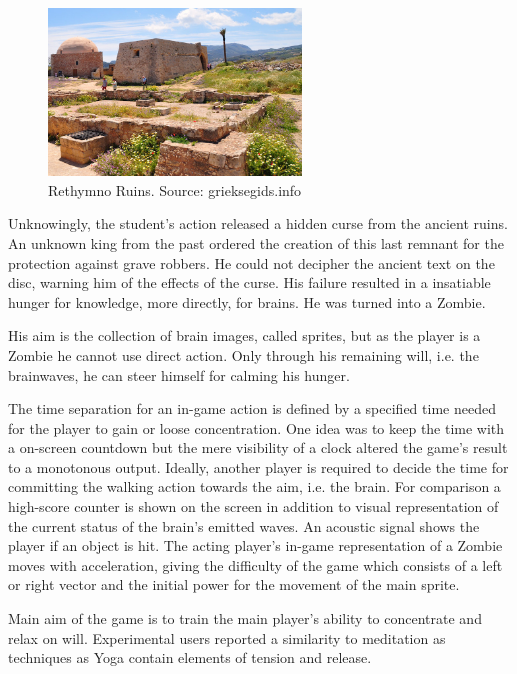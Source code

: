 \documentclass[bibtotocnumbered, headsepline,normalheadings,12pt]{report}
\begin{document}
\begin{figure}[H]
    \centering
    \includegraphics[width=0.6\textwidth]{ret.jpg}%
    \caption{Rethymno Ruins. Source: grieksegids.info}
    \label{fig:ret}%
\end{figure}

Unknowingly, the student's action released a hidden curse from the ancient ruins. An unknown king from the past ordered the creation of this 
last remnant for the protection against grave robbers. He could not decipher the ancient text on the disc, warning him of the effects of the curse.
His failure resulted in a insatiable hunger for knowledge, more directly, for brains. He was turned into a Zombie.

His aim is the collection of brain images, called sprites, but as the player is a Zombie he cannot use direct action. Only through his remaining will,
i.e. the brainwaves, he can steer himself for calming his hunger.

The time separation for an in-game action is defined by a specified time needed for the player to gain or loose concentration. One idea was to 
keep the time with a on-screen countdown but the mere visibility of a clock altered the game's result to a monotonous output. Ideally, another 
player is required to decide the time for committing the walking action towards the aim, i.e. the brain.
For comparison a high-score counter is shown on the screen in addition to visual representation of the current status of the brain's emitted waves. 
An acoustic signal shows the player if an object is hit.
The acting player's in-game representation of a Zombie moves with acceleration, giving the difficulty of the game which consists of a 
left or right vector and the initial power for the movement of the main sprite.

Main aim of the game is to train the main player's ability to concentrate and relax on will. Experimental users reported a similarity to 
meditation as techniques as Yoga contain elements of tension and release. 
\end{document}
